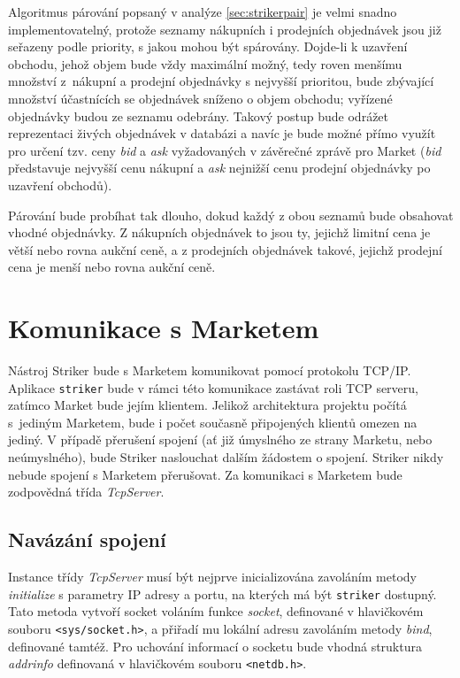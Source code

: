 \documentclass[thesis=M,czech]{FITthesis}[2012/06/26]
\begin{document}
Algoritmus párování popsaný v analýze \ref{sec:strikerpair} je velmi snadno implementovatelný, protože seznamy nákupních i 
prodejních objednávek jsou již seřazeny podle priority, s jakou mohou být spárovány. Dojde-li k uzavření obchodu, jehož objem 
bude vždy maximální možný, tedy roven menšímu množství z~nákupní a prodejní objednávky s nejvyšší prioritou, bude 
zbývající množství účastnících se objednávek sníženo o objem obchodu; vyřízené objednávky budou ze seznamu odebrány. 
Takový postup bude odrážet reprezentaci živých objednávek v databázi a navíc je bude možné přímo využít pro určení 
tzv. ceny \textit{bid} a \textit{ask} vyžadovaných v závěrečné zprávě pro Market (\textit{bid} představuje nejvyšší cenu nákupní 
a \textit{ask} nejnižší cenu prodejní objednávky po uzavření obchodů).

Párování bude probíhat tak dlouho, dokud každý z obou seznamů bude obsahovat vhodné objednávky. Z nákupních objednávek 
to jsou ty, jejichž limitní cena je větší nebo rovna aukční ceně, a z prodejních objednávek takové, jejichž prodejní cena je menší 
nebo rovna aukční ceně.


\section{Komunikace s Marketem}

Nástroj Striker bude s Marketem komunikovat pomocí protokolu TCP/IP. Aplikace \texttt{striker} bude v rámci této komunikace 
zastávat roli TCP serveru, zatímco Market bude jejím klientem. Jelikož architektura projektu počítá s~jediným Marketem, bude 
i počet současně připojených klientů omezen na jediný. V případě přerušení spojení (ať již úmyslného ze strany Marketu, nebo 
neúmyslného), bude Striker naslouchat dalším žádostem o spojení. Striker nikdy nebude spojení s Marketem přerušovat. Za 
komunikaci s Marketem bude zodpovědná třída \textit{TcpServer}.


\subsection{Navázání spojení}

Instance třídy \textit{TcpServer} musí být nejprve inicializována zavoláním metody \textit{initialize} s parametry IP adresy a 
portu, na kterých má být \texttt{striker} dostupný. Tato metoda vytvoří socket voláním funkce \textit{socket}, definované 
v hlavičkovém souboru \texttt{<sys/socket.h>}, a přiřadí mu lokální adresu zavoláním metody \textit{bind}, definované 
tamtéž. Pro uchování informací o socketu bude vhodná struktura \textit{addrinfo} definovaná v hlavičkovém souboru 
\texttt{<netdb.h>}.
\end{document}

